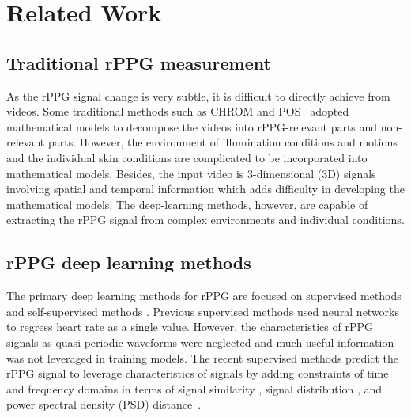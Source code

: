 \section{Related Work}
\label{sec:relatedwork}

\subsection{Traditional rPPG measurement}
As the rPPG signal change is very subtle, it is difficult to directly achieve from videos. Some traditional methods such as CHROM \cite{de2013robust} and POS~\cite{wang2016algorithmic} adopted mathematical models to decompose the videos into rPPG-relevant parts and non-relevant parts. However, the environment of illumination conditions and motions and the individual skin conditions are complicated to be incorporated into mathematical models. Besides, the input video is 3-dimensional (3D) signals involving spatial and temporal information which adds difficulty in developing the mathematical models. The deep-learning methods, however, are capable of extracting the rPPG signal from complex environments and individual conditions. 

\subsection{rPPG deep learning methods}
The primary deep learning methods for rPPG are focused on supervised methods \cite{dong2024realistic,du2023dual,yu2019remote1,yu2023physformer++} and self-supervised methods \cite{wang2022self,sun2022contrast,gideon2021way,speth2023non,liu2024rppg,park2022self}. Previous supervised methods \cite{niu2019rhythmnet} used neural networks to regress heart rate as a single value. However, the characteristics of rPPG signals as quasi-periodic waveforms were neglected and much useful information was not leveraged in training models. The recent supervised methods predict the rPPG signal to leverage characteristics of signals by adding constraints of time and frequency domains in terms of signal similarity \cite{niu2020video}, signal distribution \cite{yu2022physformer}, and power spectral density (PSD) distance~\cite{gideon2021way}.

